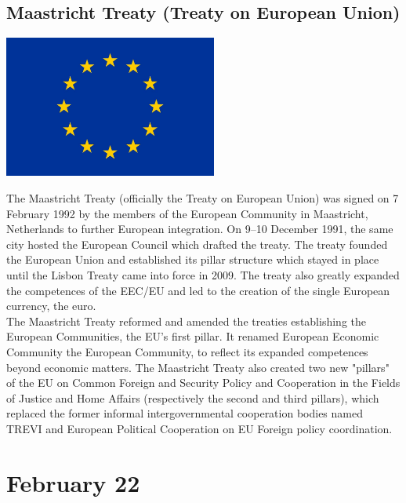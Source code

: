 \documentclass[11pt]{report}
\begin{document}
\subsection{Maastricht Treaty (Treaty on European Union)}
\vspace{2mm}\begin{center}\includegraphics[width=7cm]{./img/europeFlag.jpg}\end{center}
The Maastricht Treaty (officially the Treaty on European Union) was signed on 7 February 1992 by the members of the European Community in Maastricht, Netherlands to further European integration. On 9–10 December 1991, the same city hosted the European Council which drafted the treaty. The treaty founded the European Union and established its pillar structure which stayed in place until the Lisbon Treaty came into force in 2009. The treaty also greatly expanded the competences of the EEC/EU and led to the creation of the single European currency, the euro.\\
\indent The Maastricht Treaty reformed and amended the treaties establishing the European Communities, the EU's first pillar. It renamed European Economic Community the European Community, to reflect its expanded competences beyond economic matters. The Maastricht Treaty also created two new "pillars" of the EU on Common Foreign and Security Policy and Cooperation in the Fields of Justice and Home Affairs (respectively the second and third pillars), which replaced the former informal intergovernmental cooperation bodies named TREVI and European Political Cooperation on EU Foreign policy coordination.
\section{February 22}
\end{document}
